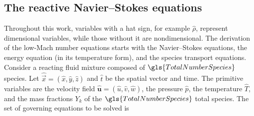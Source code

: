 \subsection{The reactive Navier--Stokes equations}\label{ssect:lowMachModel}
Throughout this work, variables with a hat sign, for example $\hat{\rho}$, represent dimensional variables, while those without it are nondimensional.  The derivation of the low-Mach number equations starts with the Navier--Stokes equations, the energy equation (in its temperature form), and the species transport equations.
Consider a reacting fluid mixture composed of $\gls{TotalNumberSpecies}$ species. Let $\hat{\vec{x}} =(\hat x, \hat y, \hat z)$ and $\hat t$ be the spatial vector and time. The primitive variables are the velocity field $\hat{\mathbf{u}} =(\hat u, \hat v, \hat w)$, the pressure $\hat p$, the temperature $\hat T$, and the mass fractions $Y_k$ of the $\gls{TotalNumberSpecies}$ total species. The set of governing equations to be solved is

